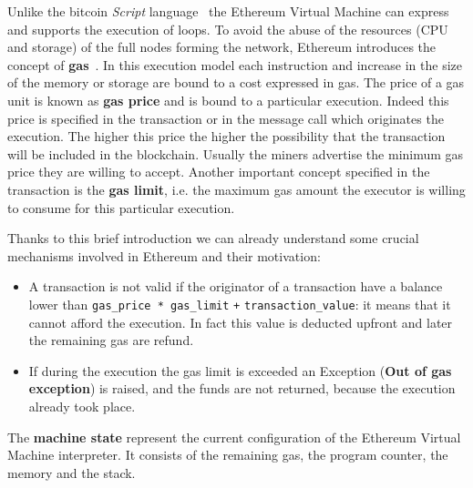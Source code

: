 Unlike the bitcoin \textit{Script} language~\cite{bib:masteringbitcoin} the
Ethereum Virtual Machine can express and supports the execution of loops.
To avoid the abuse of the resources (CPU and storage) of the full nodes
forming the network, Ethereum introduces the concept of
\textbf{gas}~\cite{wood2018ethereum}. In this
execution model each instruction and increase in the size of the memory or
storage are bound to a cost expressed in gas. The price of a gas unit
is known as \textbf{gas price} and is bound to a particular execution.
Indeed this price is specified in the transaction or in the message call
which originates the execution. The higher this price the higher the
possibility that the  transaction will be included in the blockchain.
Usually the miners advertise the minimum gas price they are willing to accept.
Another important concept specified in the transaction is the
\textbf{gas limit}, i.e. the maximum gas amount the executor is willing to
consume for this particular execution.

Thanks to this brief introduction we can already understand some crucial
mechanisms involved in Ethereum and their motivation:
\begin{itemize}
	\item A transaction is not valid if the originator of a transaction have
	a balance lower than \verb|gas_price * gas_limit| \verb|+|
	\verb|transaction_value|:
	it means that it cannot afford the execution. In fact this value is
	deducted upfront and later the remaining gas are refund.
	\item If during the execution the gas limit is exceeded an Exception
	(\textbf{Out of gas exception}) is raised, and the funds are not returned,
	because the execution already took place.
\end{itemize}


The \textbf{machine state} represent the current configuration of the
Ethereum Virtual Machine interpreter.
It consists of the remaining gas, the program counter, the memory and the
stack.
